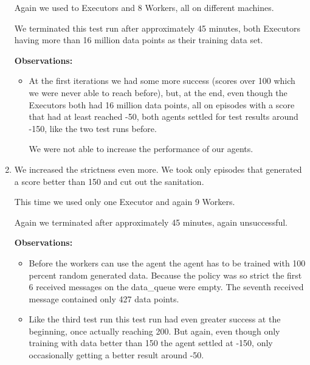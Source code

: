 \begin{enumerate}
        Again we used to Executors and 8 Workers, all on
        different machines.

        We terminated this test run after approximately 45
        minutes, both Executors having more than 16 million
        data points as their training data set.

        \textbf{Observations:}

        \begin{itemize}

          \item At the first iterations we had some more
                success (scores over 100 which we were
                never able to reach before), but, at the
                end, even though the Executors both had
                16 million data points, all on episodes
                with a score that had at least reached -50,
                both agents settled for test results around
                -150, like the two test runs before.

                We were not able to increase the
                performance of our agents.

        \end{itemize}

  \item We increased the strictness even more. We took only
        episodes that generated a score better than 150 and
        cut out the sanitation.

        This time we used only one Executor and again 9
        Workers.

        Again we terminated after approximately 45 minutes,
        again unsuccessful.

        \textbf{Observations:}

        \begin{itemize}

          \item Before the workers can use the agent the
                agent has to be trained with 100 percent
                random generated data. Because the policy
                was so strict the first 6 received
                messages on the data\_queue were empty. The
                seventh received message contained only 427
                data points.

          \item Like the third test run this test run had
                even greater success at the beginning,
                once actually reaching 200. But again, even
                though only training with data better than
                150 the agent settled at -150, only
                occasionally getting a better result around
                -50.

        \end{itemize}

\end{enumerate}

